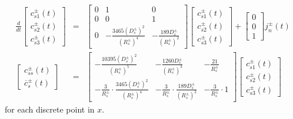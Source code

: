 \documentclass[12pt]{article}
\begin{document}
\begin{eqnarray}
\frac{d}{dt}
\left[
\begin{array}{c}
 c_{s1}^{\pm}(t) \\
 c_{s2}^{\pm}(t) \\
 c_{s3}^{\pm}(t)
\end{array}
\right]
&=&
\left[
\begin{array}{ccc}
 0 & 1  & 0  \\
 0 & 0  & 1  \\
 0 & -\frac{3465 (D_{s}^{\pm})^{2}}{(R_{s}^{\pm})^{4}}  & -\frac{189 D_{s}^{\pm}}{(R_{s}^{\pm})^{2}}  
\end{array}
\right]
\left[
\begin{array}{c}
 c_{s1}^{\pm}(t) \\
 c_{s2}^{\pm}(t) \\
 c_{s3}^{\pm}(t)
\end{array}
\right] + 
\left[
\begin{array}{c}
 0 \\
 0 \\
 1
\end{array}
\right] j_{n}^{\pm}(t) \\
\left[
\begin{array}{c}
 c_{ss}^{\pm}(t) \\
 \overline{c}_{s}^{\pm}(t)
\end{array}
\right] &=& 
\left[
\begin{array}{ccc}
 -\frac{10395 (D_{s}^{\pm})^{2}}{(R_{s}^{\pm})^{5}} & -\frac{1260 D_{s}^{\pm}}{(R_{s}^{\pm})^{3}}  & -\frac{21}{R_{s}^{\pm}}  \\
 -\frac{3}{R_{s}^{\pm}} \cdot \frac{3465 (D_{s}^{\pm})^{2}}{(R_{s}^{\pm})^{4}} & -\frac{3}{R_{s}^{\pm}} \cdot \frac{189 D_{s}^{\pm}}{(R_{s}^{\pm})^{2}} & -\frac{3}{R_{s}^{\pm}} \cdot 1
\end{array}
\right]
\left[
\begin{array}{c}
 c_{s1}^{\pm}(t) \\
 c_{s2}^{\pm}(t) \\
 c_{s3}^{\pm}(t)
\end{array}
\right]
\end{eqnarray}
for each discrete point in $x$.

\end{document}
